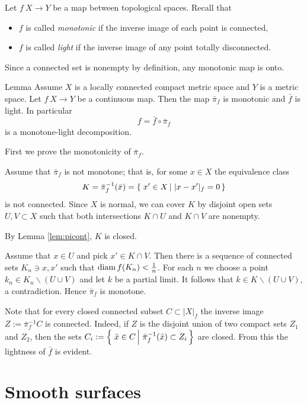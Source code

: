 \documentclass{article}
\begin{document}
Let $f\:X\to Y$ be a map between topological spaces.
Recall that 
\begin{itemize}
\item $f$ is called \emph{monotonic} if the inverse image of each point is connected,
 \item $f$ is called \emph{light} if the inverse image of any point totally disconnected.
\end{itemize}
Since a connected set is nonempty by definition, any monotonic map is onto.

\begin{thm}{Lemma}\label{cor:fiberconnected}
Assume $X$ is a locally connected compact metric space and $Y$ is a metric space.
Let $f\:X\to Y$ be a continuous map.
Then the map $\bar \pi_f$ is monotonic and $\bar f$ is light.
In particular 
\[f=\bar f\circ\bar\pi_f\]
is a monotone-light decomposition. 
\end{thm}

First we prove the monotonicity of $\bar\pi_f$.

Assume that $\bar\pi_f$ is not monotone;
that is, for some $x\in X$ the equivalence class 
\[K=\bar\pi_f^{-1}(\bar x)=\set{x'\in X}{|x-x'|_f=0}\]
is not connected. Since $X$ is normal, we
can cover $K$ by disjoint open sets $U,V\subset X$ such that both intersections
$K\cap U$ and $K\cap V$ are nonempty.

By Lemma \ref{lem:picont}, $K$ is closed.

Assume that $x\in U$ and pick $x'\in K\cap V$.
Then there is a sequence of connected sets $K_n\ni x,x'$ such that $\mathop{\rm diam}\nolimits f(K_n)<\tfrac1n$.
For each $n$ we choose a point $k_n\in K_n\backslash (U\cup V)$ and let $k$ be a partial limit.
It follows that $k\in K\backslash (U\cup V)$, a contradiction. Hence $\bar\pi_f$ is monotone.

Note that for every closed connected subset $C\subset |X|_f$ the inverse image $Z:=\bar\pi_f^{-1}C$ is
connected. Indeed, if $Z$ is the disjoint union of two compact sets $Z_1$ and $Z_2$, then the sets 
$C_i:=\set{\bar x\in C}{\bar\pi_f^{-1}(\bar x)\subset Z_i}$ are closed.
From this the lightness of $\bar f$ is evident.
\qeds








\section{Smooth surfaces}\label{sec:smooth}
\end{document}

